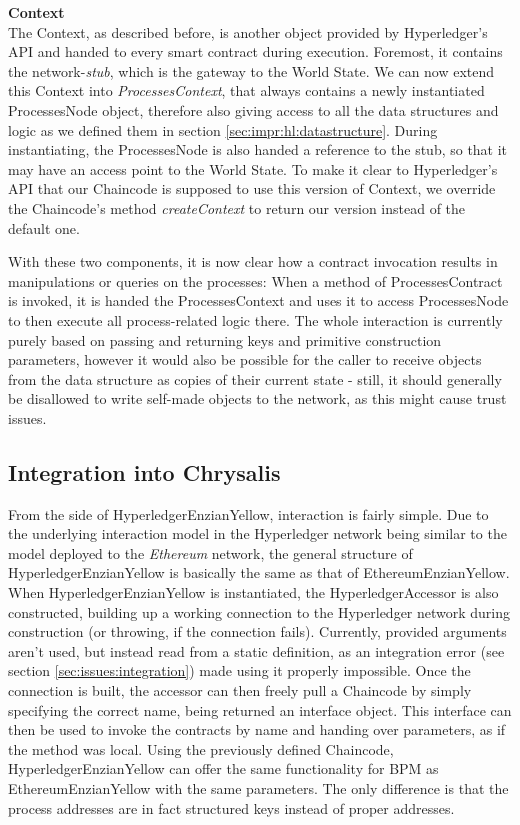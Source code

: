 \textbf{Context} \\[0.2em]
The Context, as described before, is another object provided by Hyperledger's API and handed to every smart contract during execution. Foremost, it contains the network-\emph{stub}, which is the gateway to the World State. We can now extend this Context into \emph{ProcessesContext}, that always contains a newly instantiated ProcessesNode object, therefore also giving access to all the data structures and logic as we defined them in section \ref{sec:impr:hl:datastructure}. During instantiating, the ProcessesNode is also handed a reference to the stub, so that it may have an access point to the World State. To make it clear to Hyperledger's API that our Chaincode is supposed to use this version of Context, we override the Chaincode's method \emph{createContext} to return our version instead of the default one. 

With these two components, it is now clear how a contract invocation results in manipulations or queries on the processes: When a method of ProcessesContract is invoked, it is handed the ProcessesContext and uses it to access ProcessesNode to then execute all process-related logic there. The whole interaction is currently purely based on passing and returning keys and primitive construction parameters, however it would also be possible for the caller to receive objects from the data structure as copies of their current state - still, it should generally be disallowed to write self-made objects to the network, as this might cause trust issues.

\subsection{Integration into Chrysalis}
\label{sec:impr:hl:integration}

From the side of HyperledgerEnzianYellow, interaction is fairly simple. Due to the underlying interaction model in the Hyperledger network being similar to the model deployed to the \emph{Ethereum} network, the general structure of HyperledgerEnzianYellow is basically the same as that of EthereumEnzianYellow. \newline
When HyperledgerEnzianYellow is instantiated, the HyperledgerAccessor is also constructed, building up a working connection to the Hyperledger network during construction (or throwing, if the connection fails). Currently, provided arguments aren't used, but instead read from a static definition, as an integration error (see section \ref{sec:issues:integration}) made using it properly impossible. \newline
Once the connection is built, the accessor can then freely pull a Chaincode by simply specifying the correct name, being returned an interface object. This interface can then be used to invoke the contracts by name and handing over parameters, as if the method was local. Using the previously defined Chaincode, HyperledgerEnzianYellow can offer the same functionality for BPM as EthereumEnzianYellow with the same parameters. The only difference is that the process addresses are in fact structured keys instead of proper addresses.


